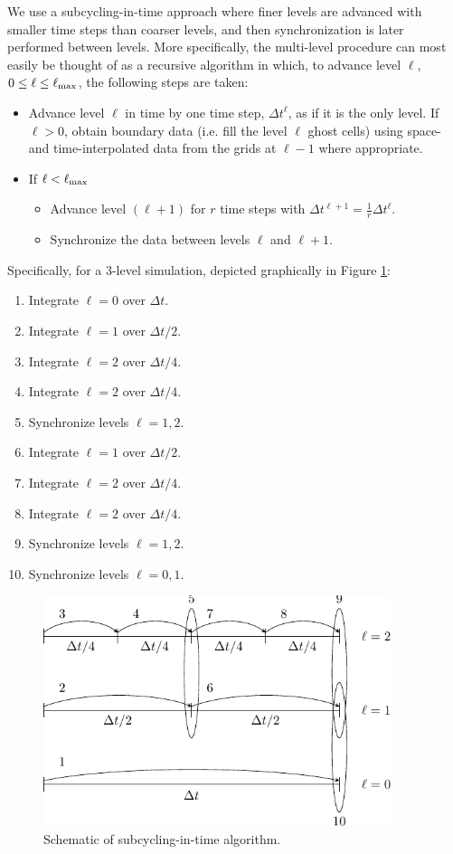 We use a subcycling-in-time approach where finer levels are advanced with smaller
time steps than coarser levels, and then synchronization is later performed between levels.
More specifically, the multi-level procedure can most
easily be thought of as a recursive algorithm in which, to advance level $\ell$,
$0\le\ell\le\ell_{\rm max}$, the following steps are taken:
\begin{itemize}
\item Advance level $\ell$ in time by one time step, $\Delta t^{\ell}$, as if it is
the only level.  If $\ell>0$, obtain boundary data (i.e. fill the level $\ell$ ghost cells)
using space- and time-interpolated data from the grids at $\ell-1$ where appropriate.
\item If $\ell<\ell_{\rm max}$
\begin{itemize}
\item Advance level $(\ell+1)$ for $r$ time steps with $\Delta t^{\ell+1} = \frac{1}{r}\Delta t^{\ell}$.
\item Synchronize the data between levels $\ell$ and $\ell+1$.
\end{itemize}
\end{itemize}
Specifically, for a 3-level simulation, depicted graphically in Figure \ref{fig:subcycling}:
\begin{enumerate}
\item Integrate $\ell=0$ over $\Delta t$.
\item Integrate $\ell=1$ over $\Delta t/2$.
\item Integrate $\ell=2$ over $\Delta t/4$.
\item Integrate $\ell=2$ over $\Delta t/4$.
\item Synchronize levels $\ell=1,2$.
\item Integrate $\ell=1$ over $\Delta t/2$.
\item Integrate $\ell=2$ over $\Delta t/4$.
\item Integrate $\ell=2$ over $\Delta t/4$.
\item Synchronize levels $\ell=1,2$.
\item Synchronize levels $\ell=0,1$.
\end{enumerate}
\begin{figure}[htb]
\begin{center}
\includegraphics[width=4in]{./AmrCore/figs/subcycling.pdf}
\caption{\label{fig:subcycling} Schematic of subcycling-in-time algorithm.}
\end{center}
\end{figure}
